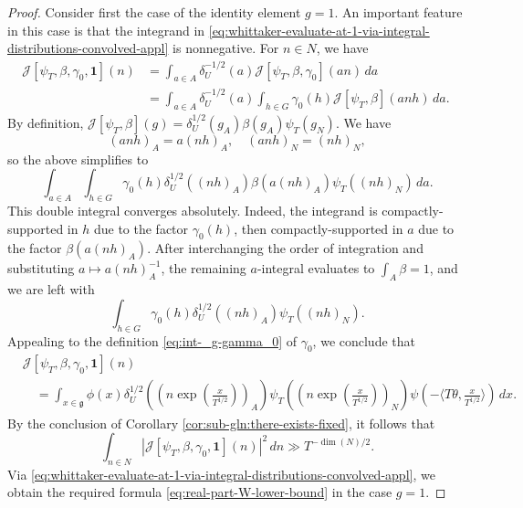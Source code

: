 \documentclass[reqno]{amsart}
\theoremstyle{plain} \newtheorem{theorem} {Theorem}
\theoremstyle{definition} \newtheorem{definition} [theorem] {Definition}
\theoremstyle{itplain} %
\numberwithin{equation}{section}
\numberwithin{theorem}{section}
\begin{document}
\begin{proof}
Consider first the case of the identity element $g = 1$.  An important feature in this case is that the integrand in \eqref{eq:whittaker-evaluate-at-1-via-integral-distributions-convolved-appl} is nonnegative.  For $n \in N$, we have
\begin{align*}
  \mathcal{J}[\psi_T,\beta,\gamma_0,\mathbf{1}](n)
  &=
    \int_{a \in A} \delta_U^{-1/2}(a) \mathcal{J}[\psi_T, \beta, \gamma_0](a n) \, d a \\
  &=
    \int _{a \in A} \delta_U^{-1/2}(a)
    \int _{h \in G }  \gamma_0(h) \mathcal{J}[\psi_T,\beta](a n h) \, d a.\
\end{align*}
By definition, $\mathcal{J}[\psi_T,\beta](g) =  \delta_U^{1/2}(g_A) \beta(g_A) \psi_T(g_N)$.  We have
\begin{equation*}
(a n h)_A = a (n h)_A, \quad (a n h)_N = (n h)_N,
\end{equation*}
so the above simplifies to
  \begin{equation*}
    \int _{a \in A}
    \int _{h \in G} \gamma_0(h)
    \delta_U^{1/2}((n h)_A)
    \beta(a (n h)_A)
    \psi_T((n h)_N) \, d a.
  \end{equation*}
  This double integral converges absolutely.  Indeed, the integrand is compactly-supported in $h$ due to the factor $\gamma_0(h)$, then compactly-supported in $a$ due to the factor $\beta(a(n h)_A)$.  After interchanging the order of integration and substituting $a \mapsto a (n h)_A^{-1}$, the remaining $a$-integral evaluates to $\int_A \beta  = 1$, and we are left with
  \begin{equation*}
    \int _{h \in G} \gamma_0(h)
    \delta_U^{1/2}((n h)_A)
    \psi_T((n h)_N).
  \end{equation*}
  Appealing to the definition \eqref{eq:int-_g-gamma_0} of $\gamma_0$, we conclude that
  \begin{align*}
    &\mathcal{J}[\psi_T,\beta,\gamma_0, \mathbf{1}](n)   \\
    &\quad
      =
    \int _{x \in \mathfrak{g} }
    \phi (x) \delta_U^{1/2}((n \exp(\tfrac{x}{T^{1/2}}))_A) \psi_T ((n \exp(\tfrac{x}{T ^{1/2} }))_N)
    \psi ( - \langle T \theta, \tfrac{x}{ T ^{1/2} } \rangle) \, d x.
  \end{align*}
  By the conclusion of Corollary \ref{cor:sub-gln:there-exists-fixed}, it follows that
  \begin{equation*}
    \int _{n \in N} \left\lvert \mathcal{J}[\psi_T,\beta,\gamma_0, \mathbf{1}](n) \right\rvert^2 \, d n \gg T^{-\dim(N)/2}.
  \end{equation*}
  Via \eqref{eq:whittaker-evaluate-at-1-via-integral-distributions-convolved-appl}, we obtain the required formula \eqref{eq:real-part-W-lower-bound} in the case $g = 1$.


\end{proof}
\end{document}
